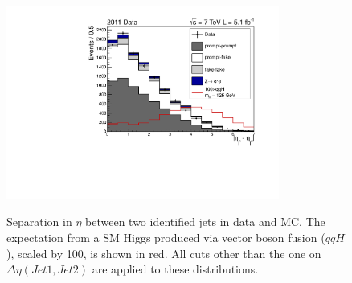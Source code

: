 \begin{figure}
\begin{center}
\includegraphics[width=0.8\textwidth]{hgg7TeV/variablePlots/cut_VBF_dEta_sequential_cat0.pdf}
\label{fig:vbfdeta}
\caption{Separation in $\eta$ between two identified jets in data and MC. 
The expectation from a SM Higgs produced via vector boson fusion ($qqH$), scaled by 100,
is shown in red. All cuts other than the one on $\Delta\eta(Jet 1, Jet2)$ are applied to these distributions.} 
\end{center}
\end{figure}

